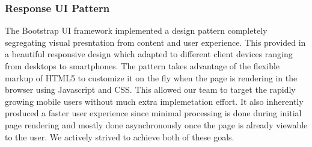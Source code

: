 \subsubsection{Response UI Pattern}
The Bootstrap UI framework implemented a design pattern completely segregating visual presntation from content and user experience. This provided in a beautiful responsive design which adapted to different client devices ranging from desktops to smartphones. The pattern takes advantage of the flexible markup of HTML5 to customize it on the fly when the page is rendering in the browser using Javascript and CSS. This allowed our team to target the rapidly growing mobile users without much extra implemetation effort. It also inherently produced a faster user experience since minimal processing is done during initial page rendering and mostly done asynchronously once the page is already viewable to the user. We actively strived to achieve both of these goals.
